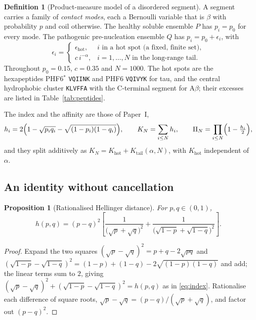 \documentclass[11pt,reqno]{amsart}
\theoremstyle{plain}
\newtheorem{proposition}[theorem]{Proposition}
\theoremstyle{definition}
\newtheorem{definition}[theorem]{Definition}
\theoremstyle{remark}
\numberwithin{equation}{section}
\newcommand{\Ab}{\mathrm{A}\beta}
\newcommand{\Kt}{K_{\mathrm{tail}}}
\newcommand{\Khot}{K_{\mathrm{hot}}}
\begin{document}
\begin{definition}[Product-measure model of a disordered segment]
\label{def:model}
A segment carries a family of \emph{contact modes}, each a Bernoulli variable that is $\beta$ with probability $p$ and coil otherwise. The healthy soluble ensemble $P$ has $p_i=p_0$ for every mode. The pathogenic pre-nucleation ensemble $Q$ has $p_i=p_0+\epsilon_i$, with
\begin{equation}
\label{eq:eps}
\epsilon_i =
\begin{cases}
\epsilon_{\mathrm{hot}}, & i \text{ in a hot spot (a fixed, finite set)},\\[2pt]
c\,i^{-\alpha}, & i = 1,\dots,N \text{ in the long-range tail}.
\end{cases}
\end{equation}
Throughout $p_0=0.15$, $c=0.35$ and $N=1000$. The hot spots are the hexapeptides PHF6$^\ast$ \texttt{VQIINK} and PHF6 \texttt{VQIVYK} for tau, and the central hydrophobic cluster \texttt{KLVFFA} with the C-terminal segment for $\Ab$; their excesses are listed in Table~\ref{tab:peptides}.
\end{definition}

The index and the affinity are those of Paper~I,
\begin{equation}
\label{eq:index}
h_i = 2\Bigl(1-\sqrt{p_iq_i}-\sqrt{(1-p_i)(1-q_i)}\Bigr),
\qquad K_N = \sum_{i\le N} h_i,
\qquad \Pi_N = \prod_{i\le N}\Bigl(1-\tfrac{h_i}{2}\Bigr),
\end{equation}
and they split additively as $K_N=\Khot+\Kt(\alpha,N)$, with $\Khot$ independent of $\alpha$.

\subsection{An identity without cancellation}

\begin{proposition}[Rationalised Hellinger distance]
\label{prop:stable}
For $p,q\in(0,1)$,
\begin{equation}
\label{eq:stable}
h(p,q) = (p-q)^2\left[\frac{1}{\bigl(\sqrt{p}+\sqrt{q}\bigr)^{2}}+\frac{1}{\bigl(\sqrt{1-p}+\sqrt{1-q}\bigr)^{2}}\right].
\end{equation}
\end{proposition}

\begin{proof}
Expand the two squares $(\sqrt p-\sqrt q)^2 = p+q-2\sqrt{pq}$ and $(\sqrt{1-p}-\sqrt{1-q})^2 = (1-p)+(1-q)-2\sqrt{(1-p)(1-q)}$ and add; the linear terms sum to $2$, giving $(\sqrt p-\sqrt q)^2+(\sqrt{1-p}-\sqrt{1-q})^2 = h(p,q)$ as in \eqref{eq:index}. Rationalise each difference of square roots, $\sqrt p-\sqrt q = (p-q)/(\sqrt p+\sqrt q)$, and factor out $(p-q)^2$.
\end{proof}
\end{document}
